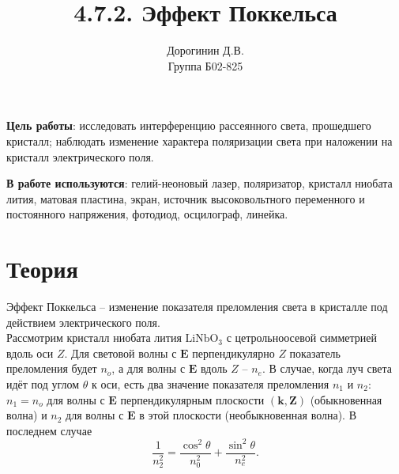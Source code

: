\documentclass[a4paper,12pt]{article}
\author{Дорогинин Д.В.\\
Группа Б02-825}
\title{4.7.2. Эффект Поккельса}
\date{}
\begin{document}
\maketitle
\textbf{Цель работы}: исследовать интерференцию рассеянного света, прошедшего кристалл; наблюдать изменение характера поляризации света при наложении на кристалл электрического поля.


\textbf{В работе используются}: гелий-неоновый лазер, поляризатор, кристалл ниобата лития, матовая пластина, экран, источник высоковольтного переменного и постоянного напряжения, фотодиод, осцилограф, линейка.
\section*{Теория}
Эффект Поккельса -- изменение показателя преломления света в кристалле под действием электрического поля.\\
Рассмотрим кристалл ниобата лития $\text{LiNbO}_3$ с цетрольноосевой симметрией вдоль оси $Z$. Для световой волны с $\mathbf{E}$ перпендикулярно $Z$ показатель преломления будет $n_o$, а для волны с $\mathbf{E}$ вдоль $Z$ -- $n_e$. В случае, когда луч света идёт под углом $\theta$ к оси, есть два значение показателя преломления $n_1$ и $n_2$: $n_1 = n_o$ для волны с $\mathbf{E}$ перпендикулярным плоскости $(\mathbf{k},\mathbf{Z})$ (обыкновенная волна) и $n_2$ для волны с $\mathbf{E}$ в этой плоскости (необыкновенная волна). В последнем случае
\begin{equation}
\dfrac{1}{n_2^2}=\dfrac{\cos^2 \theta}{n_0^2}+\dfrac{\sin^2 \theta}{n_e^2}.
\end{equation}
\end{document}
